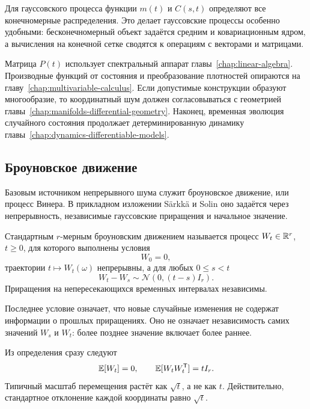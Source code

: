 Для гауссовского процесса функции $m(t)$ и $C(s,t)$ определяют все конечномерные распределения. Это делает гауссовские процессы особенно удобными: бесконечномерный объект задаётся средним и ковариационным ядром, а вычисления на конечной сетке сводятся к операциям с векторами и матрицами.

\begin{connection}
Матрица $P(t)$ использует спектральный аппарат главы~\ref{chap:linear-algebra}. Производные функций от состояния и преобразование плотностей опираются на главу~\ref{chap:multivariable-calculus}. Если допустимые конструкции образуют многообразие, то координатный шум должен согласовываться с геометрией главы~\ref{chap:manifolds-differential-geometry}. Наконец, временная эволюция случайного состояния продолжает детерминированную динамику главы~\ref{chap:dynamics-differentiable-models}.
\end{connection}

\subsection{Броуновское движение}

Базовым источником непрерывного шума служит броуновское движение, или процесс Винера. В прикладном изложении Särkkä и Solin оно задаётся через непрерывность, независимые гауссовские приращения и начальное значение.

\begin{definition}
Стандартным $r$-мерным броуновским движением называется процесс $W_t\in\mathbb{R}^r$, $t\geq0$, для которого выполнены условия
\begin{equation}
\label{eq:brownian-origin-v01}
W_0=0,
\end{equation}
траектории $t\mapsto W_t(\omega)$ непрерывны, а для любых $0\leq s<t$
\begin{equation}
\label{eq:brownian-increment-v01}
W_t-W_s
\sim
\mathcal N\!\left(0,(t-s)I_r\right).
\end{equation}
Приращения на непересекающихся временных интервалах независимы.
\end{definition}

Последнее условие означает, что новые случайные изменения не содержат информации о прошлых приращениях. Оно не означает независимость самих значений $W_s$ и $W_t$: более позднее значение включает более раннее.

Из определения сразу следуют
\begin{equation}
\label{eq:brownian-mean-variance-v01}
\mathbb{E}[W_t]=0,
\qquad
\mathbb{E}[W_tW_t^{\mathsf{T}}]=tI_r.
\end{equation}
Типичный масштаб перемещения растёт как $\sqrt{t}$, а не как $t$. Действительно, стандартное отклонение каждой координаты равно $\sqrt{t}$.

